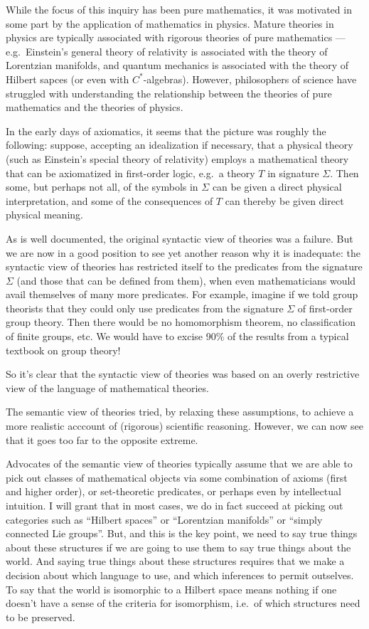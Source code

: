 \documentclass[12pt,fleqn]{article}
\begin{document}
While the focus of this inquiry has been pure mathematics, it was
motivated in some part by the application of mathematics in
physics. Mature theories in physics are typically associated with
rigorous theories of pure mathematics --- e.g.\ Einstein's general
theory of relativity is associated with the theory of Lorentzian
manifolds, and quantum mechanics is associated with the theory of
Hilbert sapces (or even with $C^*$-algebras). However, philosophers of
science have struggled with understanding the relationship between the
theories of pure mathematics and the theories of physics.

In the early days of axiomatics, it seems that the picture was roughly
the following: suppose, accepting an idealization if necessary, that a
physical theory (such as Einstein's special theory of relativity)
employs a mathematical theory that can be axiomatized in first-order
logic, e.g.\ a theory $T$ in signature $\Sigma$. Then some, but
perhaps not all, of the symbols in $\Sigma$ can be given a direct
physical interpretation, and some of the consequences of $T$ can
thereby be given direct physical meaning. 

As is well documented, the original syntactic view of theories was a
failure. But we are now in a good position to see yet another reason
why it is inadequate: the syntactic view of theories has restricted
itself to the predicates from the signature $\Sigma$ (and those that
can be defined from them), when even mathematicians would avail
themselves of many more predicates. For example, imagine if we told
group theorists that they could only use predicates from the signature
$\Sigma$ of first-order group theory. Then there would be no
homomorphism theorem, no classification of finite groups, etc. We
would have to excise 90\% of the results from a typical textbook on
group theory!

So it's clear that the syntactic view of theories was based on an
overly restrictive view of the language of mathematical theories.

The semantic view of theories tried, by relaxing these assumptions, to
achieve a more realistic acccount of (rigorous) scientific
reasoning. However, we can now see that it goes too far to the
opposite extreme.

Advocates of the semantic view of theories typically assume that we
are able to pick out classes of mathematical objects via some
combination of axioms (first and higher order), or set-theoretic
predicates, or perhaps even by intellectual intuition. I will grant
that in most cases, we do in fact succeed at picking out categories
such as ``Hilbert spaces'' or ``Lorentzian manifolds'' or ``simply
connected Lie groups''.  But, and this is the key point, we need to
say true things about these structures if we are going to use them to
say true things about the world. And saying true things about these
structures requires that we make a decision about which language to
use, and which inferences to permit outselves. To say that the world
is isomorphic to a Hilbert space means nothing if one doesn't have a
sense of the criteria for isomorphism, i.e.\ of which structures need
to be preserved.
\end{document}
